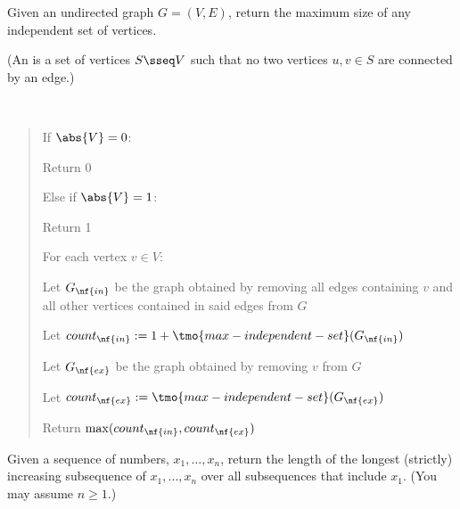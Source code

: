\documentclass[10pt]{article}
\begin{document}
Given an undirected graph \( G = (V, E) \), return the maximum size of any independent set of vertices.

(An  is a set of vertices \( S\sseq V \) such that no two vertices \( u,v\in S \) are connected by an edge.)

\begin{solution}\ %
\begin{quote}%
  \noindent{}%


  \begin{steps}
    \item If \( \abs{V} = 0 \):
      \begin{steps}
      \item Return 0
      \end{steps}
    \item Else if \( \abs{V} = 1 \):
      \begin{steps}
      \item Return 1
      \end{steps}
    \item For each vertex \( v \in V \):
      \begin{steps}
      \item Let \( G_{\nf{in}} \) be the graph obtained by removing all edges containing \( v \) and all other vertices contained in said edges from \( G \)
      \item Let \( count_{\nf{in}} := 1+\tmo{max-independent-set}(G_{\nf{in}}) \) 
      \item Let \( G_{\nf{ex}} \) be the graph obtained by removing \( v \) from \( G \)
      \item Let \( count_{\nf{ex}} := \tmo{max-independent-set}(G_{\nf{ex}}) \) 
      \item Return \( \max(count_{\nf{in}}, count_{\nf{ex}}) \)
      \end{steps}
  \end{steps}
\end{quote}%
\end{solution}%
\pagebreak

Given a sequence of numbers, \( x_1, \ldots, x_n \), return the length of the longest (strictly) increasing subsequence of \( x_1, \ldots, x_n \) over all subsequences that include \( x_1 \). (You may assume \( n \geq 1 \).)
\end{document}
